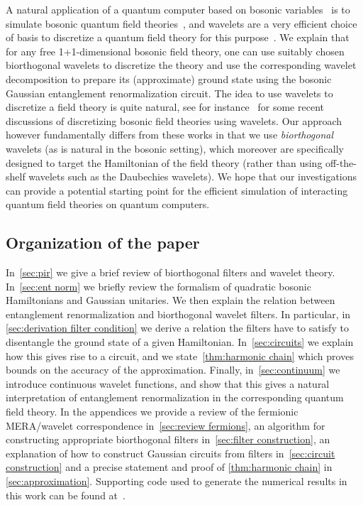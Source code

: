 \documentclass[submission, Phys]{SciPost}
\theoremstyle{definition}
\theoremstyle{remark}
\begin{document}
A natural application of a quantum computer based on bosonic variables~\cite{knill2001scheme} is to simulate bosonic quantum field theories~\cite{marshall2015quantum}, and wavelets are a very efficient choice of basis to discretize a quantum field theory for this purpose~\cite{brennen2015multiscale}.
We explain that for any free 1+1-dimensional bosonic field theory, one can use suitably chosen biorthogonal wavelets to discretize the theory and use the corresponding wavelet decomposition to prepare its (approximate) ground state using the bosonic Gaussian entanglement renormalization circuit.
The idea to use wavelets to discretize a field theory is quite natural, see for instance~\cite{bulut2013wavelets, brennen2015multiscale, stottmeister2020operator} for some recent discussions of discretizing bosonic field theories using wavelets.
Our approach however fundamentally differs from these works in that we use \emph{biorthogonal} wavelets (as is natural in the bosonic setting), which moreover are specifically designed to target the Hamiltonian of the field theory (rather than using off-the-shelf wavelets such as the Daubechies wavelets).
We hope that our investigations can provide a potential starting point for the efficient simulation of interacting quantum field theories on quantum computers.

\subsection{Organization of the paper}
In~\cref{sec:pir} we give a brief review of biorthogonal filters and wavelet theory.
In~\cref{sec:ent norm} we briefly review the formalism of quadratic bosonic Hamiltonians and Gaussian unitaries.
We then explain the relation between entanglement renormalization and biorthogonal wavelet filters.
In particular, in \cref{sec:derivation filter condition} we derive a relation the filters have to satisfy to disentangle the ground state of a given Hamiltonian.
In~\cref{sec:circuits} we explain how this gives rise to a circuit, and we state~\cref{thm:harmonic chain} which proves bounds on the accuracy of the approximation.
Finally, in~\cref{sec:continuum} we introduce continuous wavelet functions, and show that this gives a natural interpretation of entanglement renormalization in the corresponding quantum field theory.
In the appendices we provide a review of the fermionic MERA/wavelet correspondence in~\cref{sec:review fermions}, an algorithm for constructing appropriate biorthogonal filters in~\cref{sec:filter construction}, an explanation of how to construct Gaussian circuits from filters in~\cref{sec:circuit construction} and a precise statement and proof of \cref{thm:harmonic chain} in \cref{sec:approximation}.
Supporting code used to generate the numerical results in this work can be found at~\cite{pyfermions}.
\end{document}

